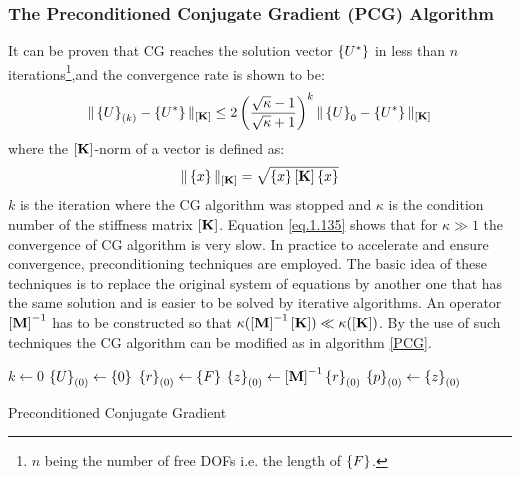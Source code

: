 \subsubsection{The Preconditioned Conjugate Gradient (PCG) Algorithm}
It can be proven \cite{saad2003iterative} that CG reaches the solution vector $\left\lbrace{U^*}\right \rbrace$ in less than $n$ iterations\footnote{$n$ being the number of free DOFs i.e. the length of $\left\lbrace{F}\right \rbrace$.},and the convergence rate is shown to be:
\begin{equation}
\label{eq.1.135}
\|\left\lbrace{U}\right \rbrace_{(k)}-\left\lbrace{U^*}\right \rbrace\|_{\left[{\mathbf{K}}\right]}\leq 2 \left(\frac{\sqrt{\kappa}-1}{\sqrt{\kappa}+1}\right)^k\|\left\lbrace{U}\right \rbrace_{0}-\left\lbrace{U^*}\right \rbrace\|_{\left[{\mathbf{K}}\right]}
\end{equation}
where the $\left[{\mathbf{K}}\right]$-norm of a vector is defined as:
\begin{equation}
\|\left\lbrace{x}\right \rbrace\|_{\left[{\mathbf{K}}\right]}=\sqrt{\left\lbrace{x}\right \rbrace\left[{\mathbf{K}}\right]\left\lbrace{x}\right \rbrace}
\end{equation}
$k$ is the iteration where the CG algorithm was stopped and $\kappa$ is the condition number of the stiffness matrix $\left[{\mathbf{K}}\right]$. Equation \ref{eq.1.135} shows that for $\kappa\gg 1$ the convergence of CG algorithm is very slow. In practice to accelerate and ensure convergence, preconditioning techniques are employed. The basic idea of these techniques is to replace the original system of equations by another one that has the same solution and is easier to be solved by iterative algorithms. An operator $\left[{\mathbf{M}}\right]^{-1}$ has to be constructed so that $\kappa(\left[{\mathbf{M}}\right]^{-1}\left[{\mathbf{K}}\right]) \ll \kappa( \left[{\mathbf{K}}\right])$.
By the use of such techniques the CG algorithm can be modified as in algorithm \ref{PCG}.
\begin{algorithm}[ht!]

$k\gets 0$\;
$\left\lbrace{U}\right \rbrace_{(0)}\gets\left\lbrace{0}\right \rbrace$\;
$\left\lbrace{r}\right \rbrace_{(0)}\gets \left\lbrace{F}\right \rbrace$\;
$\left\lbrace{z}\right \rbrace_{(0)}\gets \left[{\mathbf{M}}\right]^{-1} \left\lbrace{r}\right \rbrace_{(0)}$\;
$\left\lbrace{p}\right \rbrace_{(0)}\gets \left\lbrace{z}\right \rbrace_{(0)}$\;
 \caption{Preconditioned Conjugate Gradient \label{PCG}}
\end{algorithm}
